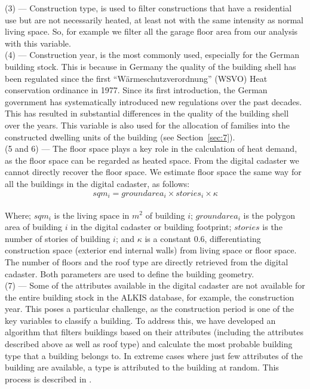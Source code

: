 \documentclass[11pt]{IJM-article}
\begin{document}
(3) --- Construction type, is used to filter constructions that have a
residential use but are not necessarily heated, at least not with the same
intensity as normal living space. So, for example we filter all the garage
floor area from our analysis with this variable.\\

(4) --- Construction year, is the most commonly used, especially for the German
building stock.  This is because in Germany the quality of the building shell
has been regulated since the first ``Wärmeschutzverordnung'' (WSVO) Heat
conservation ordinance in 1977. Since its first introduction, the German
government has systematically introduced new regulations over the past decades.
This has resulted in substantial differences in the quality of the building
shell over the years. This variable is also used for the allocation of families
into the constructed dwelling units of the building (see
Section~\ref{sec:7}).\\

(5 and 6) --- The floor space plays a key role in the calculation of heat demand,
as the floor space can be regarded as heated space. From the digital cadaster
we cannot directly recover the floor space. We estimate floor space the same
way for all the buildings in the digital cadaster, as follows:\\

\begin{equation} 
    \label{eq:3} 
    sqm_i = groundarea_i \times stories_i \times \kappa 
\end{equation}\\

Where; $sqm_i$ is the living space in $m^2$ of building $i$; $groundarea_i$ is
the polygon area of building $i$ in the digital cadaster or building footprint;
$stories$ is the number of stories of building $i$; and $\kappa$ is a constant
0.6, differentiating construction space (exterior end internal walls) from
living space or floor space. The number of floors and the roof type are
directly retrieved from the digital cadaster. Both parameters are used to
define the building geometry. \\

(7) --- Some of the attributes available in the digital cadaster are not
available for the entire building stock in the ALKIS database, for example, the
construction year. This poses a particular challenge, as the construction
period is one of the key variables to classify a building. To address this, we
have developed an algorithm that filters buildings based on their attributes
(including the attributes described above as well as roof type) and calculate
the most probable building type that a building belongs to. In extreme cases
where just few attributes of the building are available, a type is attributed
to the building at random. This process is described in .\\
\end{document}
